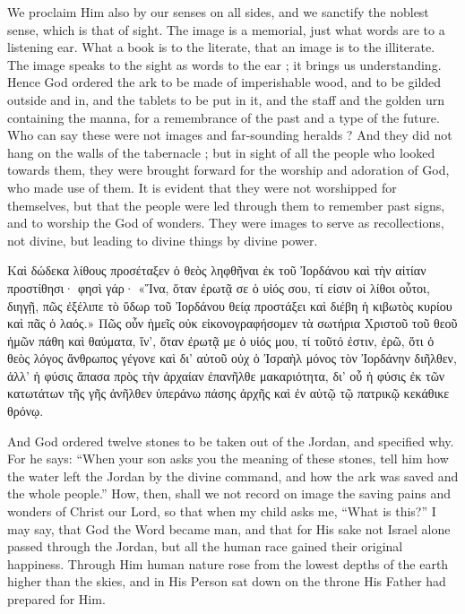 \documentclass[10pt]{book}
\newcommand{\switchgreek}[1][]{\selectlanguage{polutonikogreek} \switchcolumn*[#1]}
\newcommand{\switchenglish}{\selectlanguage{english} \switchcolumn}
\begin{document}
\begin{paracol}{2}
We proclaim Him also by our senses on all 
sides, and we sanctify the noblest sense, which 
is that of sight. The image is a memorial, just 
what words are to a listening ear. What a 
book is to the literate, that an image is to the 
illiterate. The image speaks to the sight as 
words to the ear ; it brings us understanding. 
Hence God ordered the ark to be made of 
imperishable wood, and to be gilded outside 
and in, and the tablets to be put in it, and the 
staff and the golden urn containing the manna, 
for a remembrance of the past and a type of the 
future. Who can say these were not images 
and far-sounding heralds ? And they did not 
hang on the walls of the tabernacle ; but in 
sight of all the people who looked towards 
them, they were brought forward for the 
worship and adoration of God, who made 
use of them. It is evident that they were not 
worshipped for themselves, but that the people 
were led through them to remember past signs, 
and to worship the God of wonders. They 
were images to serve as recollections, not divine, 
but leading to divine things by divine power. 

\switchgreek

Καὶ δώδεκα λίθους προσέταξεν ὁ θεὸς ληφθῆναι ἐκ τοῦ Ἰορδάνου καὶ τὴν αἰτίαν προστίθησι· φησὶ γάρ· «Ἵνα, ὅταν ἐρωτᾷ σε ὁ υἱός σου, τί εἰσιν οἱ λίθοι οὗτοι, διηγῇ, πῶς ἐξέλιπε τὸ ὕδωρ τοῦ Ἰορδάνου θείᾳ προστάξει καὶ διέβη ἡ κιβωτὸς κυρίου καὶ πᾶς ὁ λαός.» Πῶς οὖν ἡμεῖς οὐκ εἰκονογραφήσομεν τὰ σωτήρια Χριστοῦ τοῦ θεοῦ ἡμῶν πάθη καὶ θαύματα, ἵν’, ὅταν ἐρωτᾷ με ὁ υἱός μου, τί τοῦτό ἐστιν, ἐρῶ, ὅτι ὁ θεὸς λόγος ἄνθρωπος γέγονε καὶ δι’ αὐτοῦ οὐχ ὁ Ἰσραὴλ μόνος τὸν Ἰορδάνην διῆλθεν, ἀλλ’ ἡ φύσις ἅπασα πρὸς τὴν ἀρχαίαν ἐπανῆλθε μακαριότητα, δι’ οὗ ἡ φύσις ἐκ τῶν κατωτάτων τῆς γῆς ἀνῆλθεν ὑπεράνω πάσης ἀρχῆς καὶ ἐν αὐτῷ τῷ πατρικῷ κεκάθικε θρόνῳ.

\switchenglish

And God ordered twelve stones to be taken 
out of the Jordan, and specified why. For he 
says: ``When your son asks you the meaning 
of these stones, tell him how the water left the 
Jordan by the divine command, and how the 
ark was saved and the whole people.'' How, 
then, shall we not record on image the saving 
pains and wonders of Christ our Lord, so that 
when my child asks me, ``What is this?'' I 
may say, that God the Word became man, and 
that for His sake not Israel alone passed 
through the Jordan, but all the human race 
gained their original happiness. Through 
Him human nature rose from the lowest 
depths of the earth higher than the skies, and 
in His Person sat down on the throne His 
Father had prepared for Him. 


\end{paracol}
\end{document}
